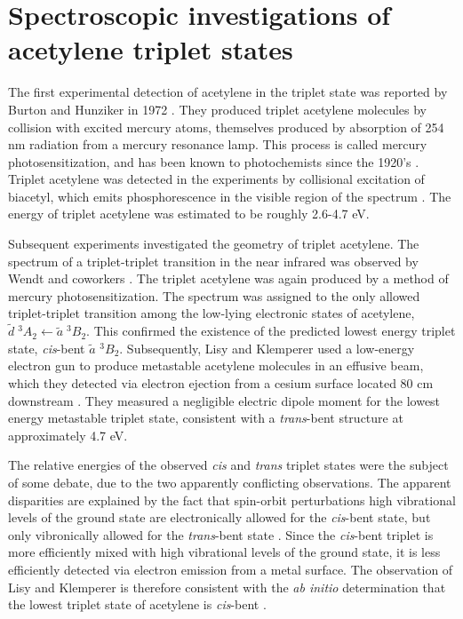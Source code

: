 \documentclass[12pt]{mitthesis}
\begin{document}
\section{Spectroscopic investigations of acetylene triplet states}

The first experimental detection of acetylene in the triplet state was
reported by Burton and Hunziker in 1972 \cite{burton72}.  They
produced triplet acetylene molecules by collision with excited mercury
atoms, themselves produced by absorption of 254 nm radiation from a
mercury resonance lamp.  This process is called mercury
photosensitization, and has been known to photochemists since the
1920's \cite{cairo22}.  Triplet acetylene was detected in the
experiments by collisional excitation of biacetyl, which emits
phosphorescence in the visible region of the spectrum \cite{burton72}.
The energy of triplet acetylene was estimated to be roughly 2.6-4.7
eV.

Subsequent experiments investigated the geometry of triplet acetylene.
The spectrum of a triplet-triplet transition in the near infrared was
observed by Wendt and coworkers \cite{wendt79}.  The triplet acetylene
was again produced by a method of mercury photosensitization.  The
spectrum was assigned to the only allowed triplet-triplet transition
among the low-lying electronic states of acetylene, $\tilde{d} \;
^3A_2 \leftarrow \tilde{a} \; ^3B_2$.  This confirmed the existence of
the predicted lowest energy triplet state, \emph{cis}-bent $\tilde{a}$
$^3B_2$.  Subsequently, Lisy and Klemperer used a low-energy electron
gun to produce metastable acetylene molecules in an effusive beam,
which they detected via electron ejection from a cesium surface
located 80 cm downstream \cite{lisy80, hemminger76}.  They measured a
negligible electric dipole moment for the lowest energy metastable
triplet state, consistent with a \emph{trans}-bent structure at
approximately 4.7 eV.

The relative energies of the observed \emph{cis} and \emph{trans}
triplet states were the subject of some debate, due to the two
apparently conflicting observations.  The apparent disparities are
explained by the fact that spin-orbit perturbations high vibrational
levels of the ground state are electronically allowed for the
\emph{cis}-bent state, but only vibronically allowed for the
\emph{trans}-bent state \cite{lundberg93}.  Since the \emph{cis}-bent
triplet is more efficiently mixed with high vibrational levels of the
ground state, it is less efficiently detected via electron emission
from a metal surface.  The observation of Lisy and Klemperer is
therefore consistent with the \emph{ab initio} determination that the
lowest triplet state of acetylene is \emph{cis}-bent
\cite{lundberg93}.
\end{document}
